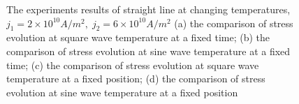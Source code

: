 \begin{figure}[!h]
\centering
{}
\caption{The experiments results of straight line at changing temperatures, $j_1=2\times10^{10}A/m^2,\;j_2=6\times10^{10}A/m^2$ (a) the comparison of stress evolution at square wave temperature at a fixed time; (b) the comparison of stress evolution at sine wave temperature at a fixed time; (c) the comparison of stress evolution at square wave temperature at a fixed position; (d) the comparison of stress evolution at sine wave temperature at a fixed position}
\label{fig:S5Results2}
\end{figure}






